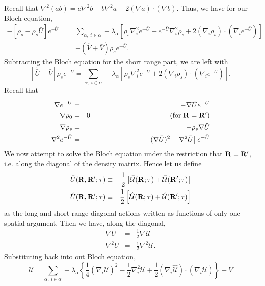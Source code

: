 \documentclass{article}
\begin{document}
Recall that $\nabla^2(ab) = a\nabla^2 b + b\nabla^2a +2(\nabla a)
\cdot (\nabla b)$.  Thus, we have for our Bloch equation,
\begin{eqnarray}
-\left [\dot{\rho_s} -\rho_s\dot{\bar{U}}\right] e^{-\bar{U}} & = &
\sum_{\alpha,\  i\in\alpha} -\lambda_\alpha
\left[\rho_s \nabla^2_i e^{-\bar{U}} + e^{-\bar{U}} \nabla^2_i \rho_s
  + 2(\nabla_i \rho_s)\cdot (\nabla_i e^{-\bar{U}}) 
\right] \nonumber \\ & & + (\hat{V} + \bar{V}) \rho_s e^{-\bar{U}}.
\end{eqnarray} 
Subtracting the Bloch equation for the short range part,
we are left with
\begin{equation}
\left[\dot{\bar{U}}-\bar{V}\right] \rho_s e^{-\bar{U}}  = 
\sum_{\alpha,\  i\in\alpha} -\lambda_\alpha
\left[\rho_s \nabla^2_i e^{-\bar{U}}
  + 2(\nabla_i \rho_s)\cdot (\nabla_i e^{-\bar{U}}) 
\right].
\end{equation} 
Recall that
\begin{eqnarray}
\nabla e^{-\bar{U}} & = & -\nabla\bar{U}e^{-\bar{U}} \\
\nabla \rho_0 & = & 0 \ \ \ \ \ \ \ \ \ \ \ \ \ \ \ \ \ \ \ \ \ \ \ \
\ \ \ \ \ \ \ \ \ 
\text{ (for $\vR = \vR'$)} \\
\nabla \rho_s & = & -\rho_s \nabla \hat{U} \\
\nabla^2 e^{-\bar{U}} & = & 
\left[(\nabla \bar{U})^2 - \nabla^2 \bar{U}\right] e^{-\bar{U}} 
\end{eqnarray} 
We now attempt to solve the Bloch equation under the restriction that
$\mathbf{R} = \mathbf{R}'$, i.e. along the diagonal of the density matrix.  Hence
let us define
\begin{eqnarray} 
\bar{U}(\mathbf{R}, \mathbf{R}';\tau) & \equiv &
  \frac{1}{2}\left[\bar{\mathcal{U}}(\mathbf{R};\tau) +
  \bar{\mathcal{U}}(\mathbf{R}';\tau) \right] \\ 
 \hat{U}(\mathbf{R},\mathbf{R}';\tau) & \equiv & 
  \frac{1}{2} \left[\hat{\mathcal{U}}(\mathbf{R};\tau) +
  \hat{\mathcal{U}}(\mathbf{R}';\tau) \right] 
\end{eqnarray}
as the long and short range diagonal actions written as
functions of only one spatial argument.  Then we have, along the
diagonal,
\begin{eqnarray}
\nabla U   & = & \frac{1}{2} \nabla\mathcal{U} \\
\nabla^2 U & = & \frac{1}{2} \nabla^2\mathcal{U}.
\end{eqnarray}
Substituting back into out Bloch equation,
\begin{equation}
\dot{\bar{\mathcal{U}}} = \sum_{\alpha, \ i\in \alpha} -\lambda_\alpha
\left\{ \frac{1}{4} (\nabla_i \bar{\mathcal{U}})^2 - 
\frac{1}{2}\nabla_i^2 \bar{\mathcal{U}} + \frac{1}{2} (\nabla_i\hat{\mathcal{U}})
  \cdot (\nabla_i \bar{\mathcal{U}}) \right\} +\bar{V}
\end{equation}
\end{document}
